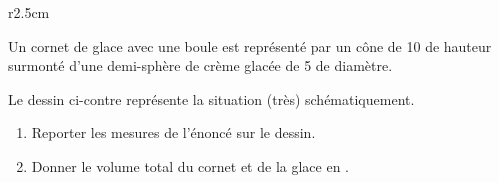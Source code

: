 
\begin{exercice}\label{exosmath-0095}

\begin{wrapfigure}{r}{2.5cm}
   \vspace{-0.5cm}        %
   \centering
   
\end{wrapfigure}

    Un cornet de glace avec une boule est représenté par un cône de \unit{10}{\centi\meter} de hauteur surmonté d'une demi-sphère de crème glacée de \unit{5}{\centi\meter} de diamètre.

    Le dessin ci-contre représente la situation (très) schématiquement.

    \begin{enumerate}
        \item
            Reporter les mesures de l'énoncé sur le dessin.
        \item
            Donner le volume total du cornet et de la glace en \centi\cubic\meter.
    \end{enumerate}

\end{exercice}
